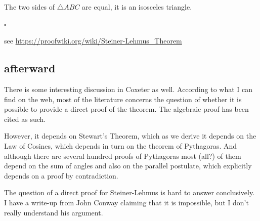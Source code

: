 \documentclass[11pt, oneside]{article}
\begin{document}
The two sides of $\triangle ABC$ are equal, it is an isosceles triangle.

$\square$

see \url{https://proofwiki.org/wiki/Steiner-Lehmus_Theorem}

\subsection*{afterward}

There is some interesting discussion in Coxeter as well.  According to what I can find on the web, most of the literature concerns the question of whether it is possible to provide a direct proof of the theorem.  The algebraic proof has been cited as such.

However, it depends on Stewart's Theorem, which as we derive it depends on the Law of Cosines, which depends in turn on the theorem of Pythagoras.  And although there are several hundred proofs of Pythagoras most (all?) of them depend on the sum of angles and also on the parallel postulate, which explicitly depends on a proof by contradiction.  

The question of a direct proof for Steiner-Lehmus is hard to answer conclusively.  I have a write-up from John Conway claiming that it is impossible, but I don't really understand his argument.  
\end{document}
